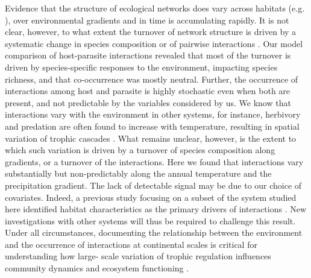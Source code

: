 \documentclass[12pt]{article}
\begin{document}
Evidence that the structure of ecological networks does vary across habitats
(e.g. \citealt{Tylianakis2007}), over environmental gradients
\citep{Lurgi2012} and in time \citep{Trojelsgaard2015} is accumulating
rapidly. It is not clear, however, to what extent the turnover of network
structure is driven by a systematic change in species composition or of
pairwise interactions \citep{Poisot2012, Poisot2015a}. Our model comparison of
host-parasite interactions revealed that most of the turnover is driven by
species-specific responses to the environment, impacting species richness, and
that co-occurrence was mostly neutral. Further, the occurrence of interactions
among host and parasite is highly stochastic even when both are present, and
not predictable by the variables considered by us. We know that interactions
vary with the environment in other systems, for instance, herbivory
\citep{Shurin2012, Baskett2018} and predation \citep{Mckinnon2010,
Legagneux2014} are often found to increase with temperature, resulting in
spatial variation of trophic cascades \citep{Gray2016}. What remains unclear,
however, is the extent to which such variation is driven by a turnover of
species composition along gradients, or a turnover of the interactions. Here
we found that interactions vary substantially but non-predictably along the
annual temperature and the precipitation gradient. The lack of detectable
signal may be due to our choice of covariates. Indeed, a previous study focusing on a subset of the system studied here identified habitat characteristics as the primary drivers of
interactions \citep{Nyman2015}. New investigations with other systems will
thus be required to challenge this result. Under all circumstances,
documenting the relationship between the environment and the occurrence of
interactions at continental scales is critical for understanding how large-
scale variation of trophic regulation influences community dynamics and
ecosystem functioning \citep{Harfoot2014}.
\end{document}
